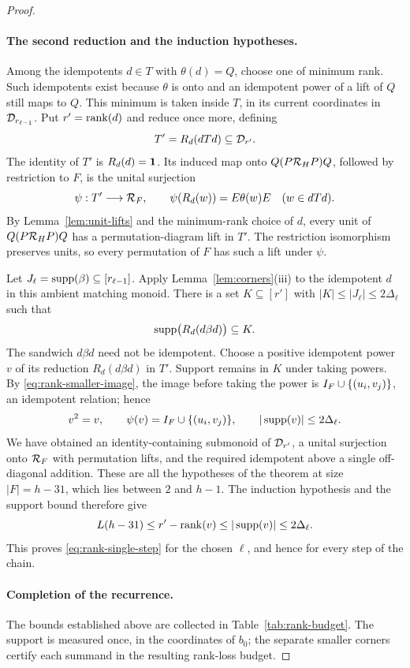 \begin{proof}
\paragraph{The second reduction and the induction hypotheses.}
Among the idempotents $d\in T$ with $\theta(d)=Q$, choose one of
minimum rank. Such idempotents exist because $\theta$ is onto and
an idempotent power of a lift of $Q$ still maps to $Q$. This minimum
is taken inside $T$, in its current coordinates in
$\mathcal D_{r_{\ell-1}}$. Put $r'=\operatorname{rank}(d)$ and reduce once more, defining
\[
 T'=R_d(dTd)\subseteq\mathcal D_{r'}.
\]
The identity of $T'$ is $R_d(d)=\mathbf 1$. Its induced map onto
$Q(P\mathcal R_{H}P)Q$, followed by restriction to $F$, is the unital
surjection
\[
 \psi:T'\longrightarrow\mathcal R_{F},\qquad
 \psi(R_d(w))=E\theta(w)E\quad(w\in dTd).
\]
By Lemma~\ref{lem:unit-lifts} and the minimum-rank choice of $d$,
every unit of $Q(P\mathcal R_{H}P)Q$ has a permutation-diagram lift in $T'$.
The restriction isomorphism preserves units, so every permutation of
$F$ has such a lift under $\psi$.

Let $J_\ell=\operatorname{supp}(\beta)\subseteq[r_{\ell-1}]$. Apply
Lemma~\ref{lem:corners}(iii) to the idempotent $d$ in this ambient
matching monoid. There is a set $K\subseteq[r']$ with
$|K|\le|J_\ell|\le2\Delta_\ell$ such that
\[
 \operatorname{supp}\bigl(R_d(d\beta d)\bigr)\subseteq K.
\]
The sandwich $d\beta d$ need not be idempotent. Choose a positive
idempotent power $v$ of its reduction $R_d(d\beta d)$ in $T'$.
Support remains in $K$ under taking powers. By
\eqref{eq:rank-smaller-image}, the image before taking the power is
$I_{F}\cup\{(u_i,v_j)\}$, an idempotent relation; hence
\[
 v^2=v,
 \qquad \psi(v)=I_{F}\cup\{(u_i,v_j)\},
 \qquad |\operatorname{supp}(v)|\le2\Delta_\ell.
\]
We have obtained an identity-containing submonoid of $\mathcal D_{r'}$, a
unital surjection onto $\mathcal R_{F}$ with permutation lifts, and the
required idempotent above a single off-diagonal addition. These are
all the hypotheses of the theorem at size $|F|=h-31$, which lies
between $2$ and $h-1$. The induction hypothesis and the support bound
therefore give
\[
 L(h-31)\le r'-\operatorname{rank}(v)
        \le|\operatorname{supp}(v)|\le2\Delta_\ell.
\]
This proves \eqref{eq:rank-single-step} for the chosen $\ell$, and
hence for every step of the chain.

\paragraph{Completion of the recurrence.}
The bounds established above are collected in
Table~\ref{tab:rank-budget}. The support is measured once, in the
coordinates of $b_0$; the separate smaller corners certify each
summand in the resulting rank-loss budget.


\end{proof}
